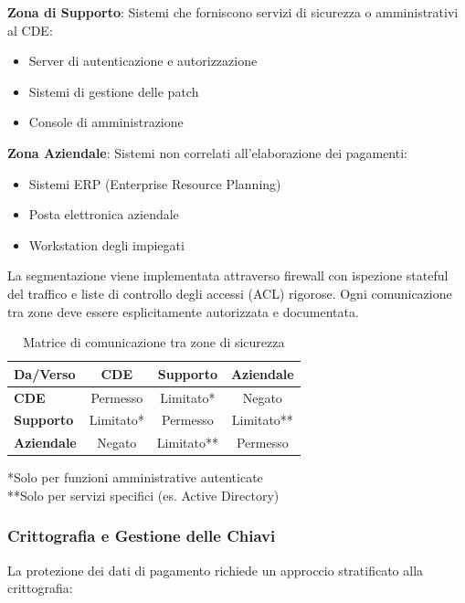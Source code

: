 \textbf{Zona di Supporto}: Sistemi che forniscono servizi di sicurezza o amministrativi al CDE:
\begin{itemize}
    \item Server di autenticazione e autorizzazione
    \item Sistemi di gestione delle patch
    \item Console di amministrazione
\end{itemize}

\textbf{Zona Aziendale}: Sistemi non correlati all'elaborazione dei pagamenti:
\begin{itemize}
    \item Sistemi ERP (Enterprise Resource Planning)
    \item Posta elettronica aziendale
    \item Workstation degli impiegati
\end{itemize}

La segmentazione viene implementata attraverso firewall con ispezione stateful del traffico e liste di controllo degli accessi (ACL) rigorose. Ogni comunicazione tra zone deve essere esplicitamente autorizzata e documentata.

\begin{table}[h]
\centering
\caption{Matrice di comunicazione tra zone di sicurezza}
\label{tab:matrice_comunicazione}
\begin{tabular}{|l|c|c|c|}
\hline
\textbf{Da/Verso} & \textbf{CDE} & \textbf{Supporto} & \textbf{Aziendale} \\
\hline
\textbf{CDE} & Permesso & Limitato* & Negato \\
\hline
\textbf{Supporto} & Limitato* & Permesso & Limitato** \\
\hline
\textbf{Aziendale} & Negato & Limitato** & Permesso \\
\hline
\end{tabular}
\vspace{0.5cm}
\small{*Solo per funzioni amministrative autenticate\\
**Solo per servizi specifici (es. Active Directory)}
\end{table}

\subsubsection{Crittografia e Gestione delle Chiavi}

La protezione dei dati di pagamento richiede un approccio stratificato alla crittografia:

